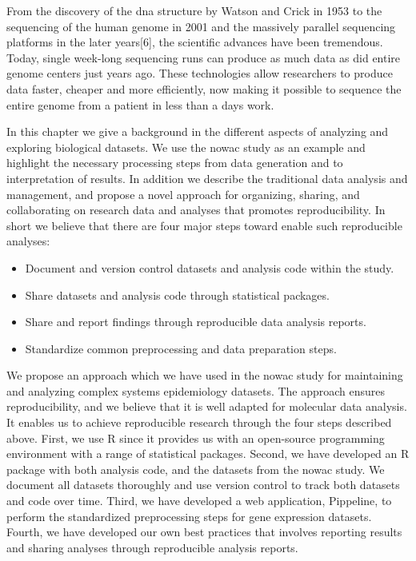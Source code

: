 From the discovery of the \gls{dna} structure by Watson and Crick in
1953\cite{watson1953molecular} to the sequencing of the human genome in 2001
\cite{venter2001sequence,international2001initial} and the massively parallel
sequencing platforms in the later years[6], the scientific advances have been
tremendous. Today, single week-long sequencing runs can produce as much data as
did entire genome centers just years ago.\cite{kahn2011future}  These
technologies allow researchers to produce data faster, cheaper and more
efficiently, now making it possible to sequence the entire genome from a patient
in less than a days work. 

In this chapter we give a background in the different aspects of analyzing and
exploring biological datasets. We use the \gls{nowac} study as an example and
highlight the necessary processing steps from data generation and to
interpretation of results. In addition we describe the traditional data analysis
and management, and propose a novel approach for organizing, sharing, and
collaborating on research data and analyses that promotes reproducibility. In
short we believe that there are four major steps toward enable such reproducible
analyses:

\begin{itemize} 
    \item Document and version control datasets and analysis code within the
        study. 
    \item Share datasets and analysis code through statistical packages. 
    \item Share and report findings through reproducible data analysis reports. 
    \item Standardize common preprocessing and data preparation steps.
\end{itemize} 

We propose an approach which we have used in the \gls{nowac} study for
maintaining and analyzing complex systems epidemiology datasets. The approach
ensures reproducibility, and we believe that it is well adapted for molecular
data analysis. It enables us to achieve reproducible research through the four
steps described above. First, we use R since it provides us with an open-source
programming environment with a range of statistical packages.  Second, we have
developed an R package with both analysis code, and the datasets from the
\gls{nowac} study. We document all datasets thoroughly and use version control
to track both datasets and code over time. Third, we have developed a web
application, Pippeline, to perform the standardized preprocessing steps for gene
expression datasets.  Fourth, we have developed our own best practices that
involves reporting results and sharing analyses through reproducible analysis
reports. 


